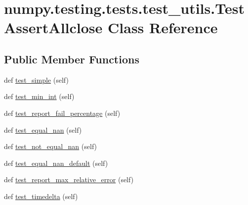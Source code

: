 \hypertarget{classnumpy_1_1testing_1_1tests_1_1test__utils_1_1TestAssertAllclose}{}\section{numpy.\+testing.\+tests.\+test\+\_\+utils.\+Test\+Assert\+Allclose Class Reference}
\label{classnumpy_1_1testing_1_1tests_1_1test__utils_1_1TestAssertAllclose}
\subsection*{Public Member Functions}
\begin{DoxyCompactItemize}
\item 
def \hyperlink{classnumpy_1_1testing_1_1tests_1_1test__utils_1_1TestAssertAllclose_a49c6952a5d533f3bad5078e18e12b738}{test\+\_\+simple} (self)
\item 
def \hyperlink{classnumpy_1_1testing_1_1tests_1_1test__utils_1_1TestAssertAllclose_a132dcc7c8534f3967368734f0bb05a41}{test\+\_\+min\+\_\+int} (self)
\item 
def \hyperlink{classnumpy_1_1testing_1_1tests_1_1test__utils_1_1TestAssertAllclose_a053585265cb48e8bb2167c0eaee79fe4}{test\+\_\+report\+\_\+fail\+\_\+percentage} (self)
\item 
def \hyperlink{classnumpy_1_1testing_1_1tests_1_1test__utils_1_1TestAssertAllclose_aa7c169c08d1a2b1996ea5a830c338052}{test\+\_\+equal\+\_\+nan} (self)
\item 
def \hyperlink{classnumpy_1_1testing_1_1tests_1_1test__utils_1_1TestAssertAllclose_a1168bdfa3fd720994bb9ff694a4c6a6d}{test\+\_\+not\+\_\+equal\+\_\+nan} (self)
\item 
def \hyperlink{classnumpy_1_1testing_1_1tests_1_1test__utils_1_1TestAssertAllclose_aaa13362c58565154b4b8cc446312058b}{test\+\_\+equal\+\_\+nan\+\_\+default} (self)
\item 
def \hyperlink{classnumpy_1_1testing_1_1tests_1_1test__utils_1_1TestAssertAllclose_a1916cb3954c9bee0b5210511e613298a}{test\+\_\+report\+\_\+max\+\_\+relative\+\_\+error} (self)
\item 
def \hyperlink{classnumpy_1_1testing_1_1tests_1_1test__utils_1_1TestAssertAllclose_ae4839d51bb2047be3fb20b15dc945c84}{test\+\_\+timedelta} (self)
\end{DoxyCompactItemize}


